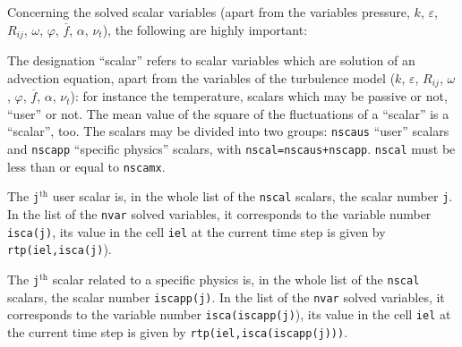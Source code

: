 {{{\bigskip

Concerning the solved scalar variables (apart from the variables
pressure, $k$, $\varepsilon$, $R_{ij}$, $\omega$, $\varphi$,
$\overline{f}$, $\alpha$, $\nu_t$), the following are highly important:
\begin{list}{-}{}
\item The designation ``scalar'' refers to scalar variables which are
      solution of an advection equation, apart from the variables of the
      turbulence model  ($k$, $\varepsilon$, $R_{ij}$, $\omega$,
      $\varphi$, $\overline{f}$, $\alpha$, $\nu_t$): for instance the temperature, scalars
      which may be passive or not, ``user'' or not. The mean value of
      the square of the fluctuations of a ``scalar'' is a
      ``scalar'', too. The scalars may be divided into two groups:
      \texttt{nscaus} ``user'' scalars and \texttt{nscapp}
      ``specific physics'' scalars, with
      \texttt{nscal=nscaus+nscapp}. \texttt{nscal} must be less than or
       equal to \texttt{nscamx}.
\item The \texttt{j}$^{\text{th}}$ user scalar is, in
      the whole list of the \texttt{nscal} scalars, the scalar number
      \texttt{j}. In the list of the \texttt{nvar} solved variables, it
      corresponds to the variable number \texttt{isca(j)},
      its value in the cell \texttt{iel} at the current time step is given by
      \texttt{rtp(iel,isca(j)}).
\item The \texttt{j}$^{\text{th}}$ scalar related to a specific physics is, in
      the whole list of the \texttt{nscal} scalars, the scalar number
      \texttt{iscapp(j)}. In the list of the \texttt{nvar} solved variables, it
      corresponds to the variable number
      \texttt{isca(iscapp(j)}),
      its value in the cell \texttt{iel} at the current time step is given by
      \texttt{rtp(iel,isca(iscapp(j)))}.


\end{list}}}}
